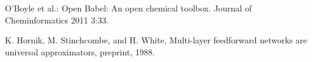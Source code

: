 \begin{thebibliography}{9}
		O’Boyle et al.: Open Babel: An open chemical
toolbox. Journal of Cheminformatics 2011 3:33.

		K. Hornik, M. Stinchcombe, and H. White, Multi-layer feedforward networks are universal 	approximators, preprint, 1988. 
	

          
\end{thebibliography}